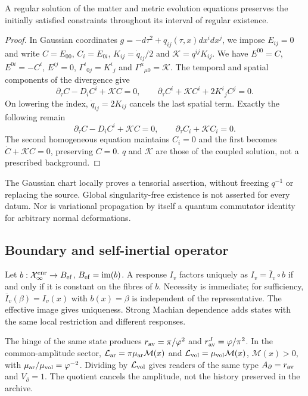 \begin{proposition}
\label{hmtcuatro:gea:propagacion} A regular solution of the matter and metric evolution equations preserves the initially satisfied constraints throughout its interval of regular existence.
\end{proposition}
\begin{proof}
In Gaussian coordinates $g=-d\tau^2+q_{ij}(\tau,x)dx^idx^j$, we impose $E_{ij}=0$ and write $C=E_{00}$, $C_i=E_{0i}$, $K_{ij}=\dot q_{ij}/2$ and $\mathcal K=q^{ij}K_{ij}$. We have $E^{00}=C$, $E^{0i}=-C^i$, $E^{ij}=0$, $\Gamma^i{}_{0j}=K^i{}_j$ and $\Gamma^\mu{}_{\mu0}=\mathcal K$. The temporal and spatial components of the divergence give
\[
\partial_\tau C-D_iC^i+\mathcal KC=0,\qquad
\partial_\tau C^i+\mathcal KC^i+2K^i{}_jC^j=0.
\]
On lowering the index, $\dot q_{ij}=2K_{ij}$ cancels the last spatial term. Exactly the following remain
\begin{equation}
\partial_\tau C-D_iC^i+\mathcal KC=0,\qquad
\partial_\tau C_i+\mathcal KC_i=0.
\label{hmtcuatro:gea:propagacion-sistema}
\end{equation}
The second homogeneous equation maintains $C_i=0$ and the first becomes $\dot C+\mathcal KC=0$, preserving $C=0$. $q$ and $\mathcal K$ are those of the coupled solution, not a prescribed background.
\end{proof}
The Gaussian chart locally proves a tensorial assertion, without freezing $q^{-1}$ or replacing the source. Global singularity-free existence is not asserted for every datum. Nor is variational propagation by itself a quantum commutator identity for arbitrary normal deformations.

\subsection{Boundary and self-inertial operator}
\label{hmtcuatro:gea:autoinercia}

Let $b:\mathcal X_\infty^{\rm enr}\to B_{\rm ef}$, $B_{\rm ef}=\operatorname{im}(b)$. A response $I_v$ factors uniquely as $I_v=\overline I_v\circ b$ if and only if it is constant on the fibres of $b$. Necessity is immediate; for sufficiency, $\overline I_v(\beta)=I_v(x)$ with $b(x)=\beta$ is independent of the representative. The effective image gives uniqueness. Strong Machian dependence adds states with the same local restriction and different responses.

The hinge of the same state produces $r_{\rm av}=\pi/\varphi^2$ and $r_{\rm av}^J=\varphi/\pi^2$. In the common-amplitude sector, $\mathcal L_{\rm ar}=\pi\mu_{\rm ar}\mathcal M(x)$ and $\mathcal L_{\rm vol}=\mu_{\rm vol}\mathcal M(x)$, $\mathcal M(x)>0$, with $\mu_{\rm ar}/\mu_{\rm vol}=\varphi^{-2}$. Dividing by $\mathcal L_{\rm vol}$ gives readers of the same type $A_\partial=r_{\rm av}$ and $V_\partial=1$. The quotient cancels the amplitude, not the history preserved in the archive.

